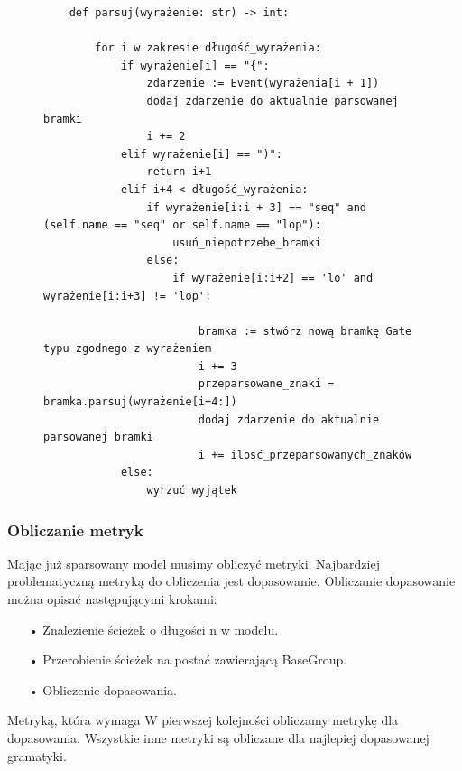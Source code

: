 \begin{figure}[!ht]
\lstset{caption=Parser gramatyki, captionpos=b}
\lstset{label=src:passive, frame=single}
\begin{lstlisting}
    def parsuj(wyrażenie: str) -> int:

        for i w zakresie długość_wyrażenia:
            if wyrażenie[i] == "{":
                zdarzenie := Event(wyrażenia[i + 1])
                dodaj zdarzenie do aktualnie parsowanej bramki 
                i += 2
            elif wyrażenie[i] == ")":
                return i+1
            elif i+4 < długość_wyrażenia:
                if wyrażenie[i:i + 3] == "seq" and (self.name == "seq" or self.name == "lop"):
                    usuń_niepotrzebe_bramki
                else:
                    if wyrażenie[i:i+2] == 'lo' and wyrażenie[i:i+3] != 'lop':
                    
                	    bramka := stwórz nową bramkę Gate typu zgodnego z wyrażeniem 
                	    i += 3
                	    przeparsowane_znaki = bramka.parsuj(wyrażenie[i+4:])
                	    dodaj zdarzenie do aktualnie parsowanej bramki 
                	    i += ilość_przeparsowanych_znaków
            else:
                wyrzuć wyjątek
\end{lstlisting}
\end{figure}

\subsubsection{Obliczanie metryk}
Mając już sparsowany model musimy obliczyć metryki. Najbardziej problematyczną metryką do obliczenia jest dopasowanie. Obliczanie dopasowanie można opisać następującymi krokami:
\begin{itemize}
  \item[•] Znalezienie ścieżek o długości n w modelu.
  \item[•] Przerobienie ścieżek na postać zawierającą BaseGroup.
  \item[•] Obliczenie dopasowania.
\end{itemize}
Metryką, która wymaga 
W pierwszej kolejności obliczamy metrykę dla dopasowania. Wszystkie inne metryki są obliczane dla najlepiej dopasowanej gramatyki.
 
